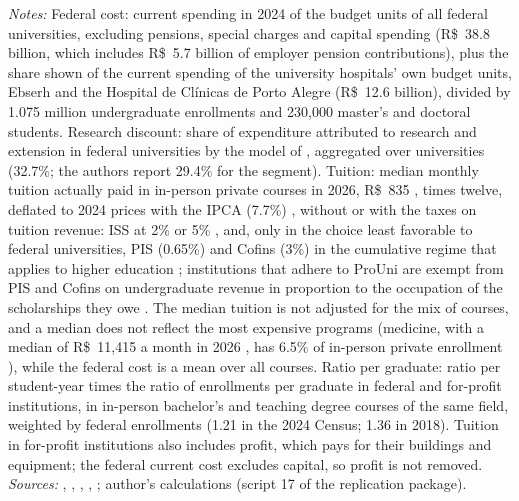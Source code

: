 \documentclass[12pt,letterpaper]{article}
\begin{document}
\begin{table}[!htbp]
\begin{minipage}{\linewidth}
\textit{Notes:} Federal cost: current spending in 2024 of the budget units of all federal universities, excluding pensions, special charges and capital spending (R\$~38.8 billion, which includes R\$~5.7 billion of employer pension contributions), plus the share shown of the current spending of the university hospitals' own budget units, Ebserh and the Hospital de Cl\'inicas de Porto Alegre (R\$~12.6 billion), divided by 1.075 million undergraduate enrollments and 230,000 master's and doctoral students. Research discount: share of expenditure attributed to research and extension in federal universities by the model of \citet{bielschowsky2022}, aggregated over universities (32.7\%; the authors report 29.4\% for the segment). Tuition: median monthly tuition actually paid in in-person private courses in 2026, R\$~835 \citep{hoper2026}, times twelve, deflated to 2024 prices with the IPCA (7.7\%) \citep{ibgeipca}, without or with the taxes on tuition revenue: ISS at 2\% or 5\% \citep[arts.~8 and~8-A]{lc116}, and, only in the choice least favorable to federal universities, PIS (0.65\%) and Cofins (3\%) in the cumulative regime that applies to higher education \citep[art.~10, XIV]{lei10833}; institutions that adhere to ProUni are exempt from PIS and Cofins on undergraduate revenue in proportion to the occupation of the scholarships they owe \citep[art.~8]{lei11096}. The median tuition is not adjusted for the mix of courses, and a median does not reflect the most expensive programs (medicine, with a median of R\$~11,415 a month in 2026 \citep{hoper2026}, has 6.5\% of in-person private enrollment \citep{inepcenso}), while the federal cost is a mean over all courses. Ratio per graduate: ratio per student-year times the ratio of enrollments per graduate in federal and for-profit institutions, in in-person bachelor's and teaching degree courses of the same field, weighted by federal enrollments (1.21 in the 2024 Census; 1.36 in 2018). Tuition in for-profit institutions also includes profit, which pays for their buildings and equipment; the federal current cost excludes capital, so profit is not removed. \textit{Sources:} \citet{cgu2024}, \citet{inepcenso}, \citet{capes2024}, \citet{hoper2026}, \citet{ibgeipca}; author's calculations (script 17 of the replication package).
\end{minipage}
\end{table}
\end{document}
